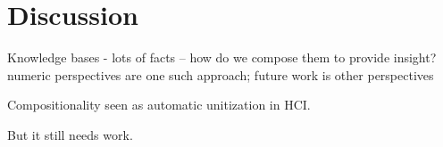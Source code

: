 \section{Discussion}

Knowledge bases - lots of facts -- how do we compose them to provide insight? numeric perspectives are one such approach; future work is other perspectives

Compositionality seen as automatic unitization in HCI.

But it still needs work.
